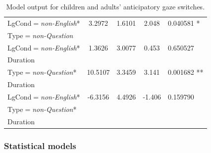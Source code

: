 \documentclass[authoryear, 12pt]{elsarticle}
\begin{document}
\begin{table}[h!]
\begin{scriptsize}
\begin{center}
\begin{tabular}{lcccl}
    LgCond$=$\textit{non-English}* &           3.2972 &    1.6101 &  2.048 & 0.040581 * \\ 
    Type$=$\textit{non-Question} &&&& \\
    LgCond$=$\textit{non-English}* &        1.3626 &    3.0077 &  0.453 & 0.650527     \\
    \hspace*{5mm} Duration &&&& \\
    Type$=$\textit{non-Question}*          &  10.5107 &    3.3459 &  3.141 & 0.001682  ** \\
    \hspace*{5mm} Duration &&&& \\
    LgCond$=$\textit{non-English}* & -6.3156 &    4.4926 & -1.406 & 0.159790 \\    
    Type$=$\textit{non-Question}* &&&& \\
    \hspace*{5mm} Duration &&&& \\
    \hline
  \end{tabular}
\end{center}
  \end{scriptsize}
  \caption{Model output for children and adults' anticipatory gaze switches.}
\label{tab:E1-models}
\end{table}

\subsubsection{Statistical models}
\label{sec:models1}
\end{document}
